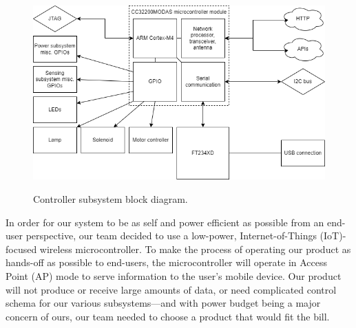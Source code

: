 \documentclass[journal]{IEEEtran}
\begin{document}
\begin{figure}[H]
   \centering
   \includegraphics[width=\linewidth]{images/control-block-diagram.png}
   \label{fig:control-block-diagram}
   \caption{Controller subsystem block diagram.}
\end{figure}

In order for our system to be as self and power efficient as possible from an end-user perspective, our 
team decided to use a low-power, Internet-of-Things (IoT)-focused wireless microcontroller. To make the 
process of operating our product as hands-off as possible to end-users, the microcontroller will operate 
in Access Point (AP) mode to serve information to the user's mobile device. Our product will not produce 
or receive large amounts of data, or need complicated control schema for our various subsystems---and with 
power budget being a major concern of ours, our team needed to choose a product that would fit the bill.
\end{document}
